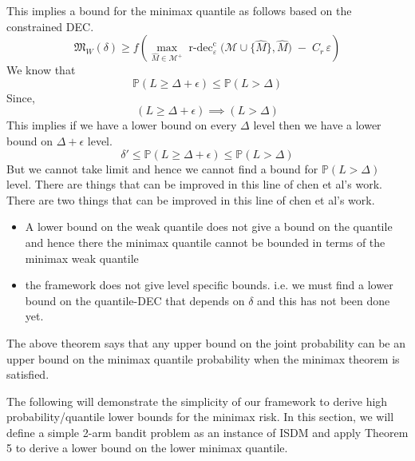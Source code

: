 \documentclass[conference]{IEEEtran}
\newtheorem{theorem}{Theorem}
\begin{document}
This implies a bound for the minimax quantile as follows based on the constrained DEC.
\[
\mathfrak{M}_W(\delta) \geq f(\max_{\widehat{M}\in\mathcal{M}^{+}}
      \operatorname{r\text{-}dec}^{\mathrm{c}}_{\varepsilon}\!\bigl(\mathcal{M}\cup\{\widehat{M}\},\widehat{M}\bigr)
      \;-\;
      C_{r}\,\varepsilon)
\]
We know that 
\[
\mathbb{P}(L\geq \Delta + \epsilon) \leq \mathbb{P}(L>\Delta )
\]
Since,
\[
(L\geq \Delta + \epsilon) \implies (L>\Delta )
\]
This implies if we have a lower bound on every $\Delta$ level then we have a lower bound on $\Delta+ \epsilon$ level.
\[
\delta'\leq\mathbb{P}(L\geq \Delta + \epsilon) \leq \mathbb{P}(L>\Delta )
\]
But we cannot take limit and hence we cannot find a bound for 
$
 \mathbb{P}(L>\Delta )
$ level.
There are  things that can be improved in this line of chen et al's work.
There are two things that can be improved in this line of chen et al's work.
\begin{itemize}
    \item A lower bound on the weak quantile does not give a bound on the quantile and hence there the minimax quantile cannot be bounded in terms of the  minimax weak quantile
    \item the framework does not give level specific bounds. i.e. we must find a lower bound on the quantile-DEC that depends on $\delta$ and this has not been done yet.
\end{itemize}



The above theorem says that any upper bound on the joint probability can be an upper bound on the minimax quantile probability when the minimax theorem is satisfied.

\fi








\iffalse
The following will demonstrate the simplicity of our framework to derive high probability/quantile lower bounds for the minimax risk. 
In this section, we will define a simple 2-arm bandit problem as an instance of ISDM and apply Theorem 5 to derive a lower bound on the lower minimax quantile. 
\end{document}
